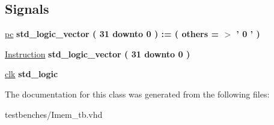 \subsection*{\-Signals}
 \begin{DoxyCompactItemize}
\item 
\hypertarget{class_imem__tb_1_1behavior_a910b9e51355861e290a75682f69dbdb9}{\hyperlink{class_imem__tb_1_1behavior_a910b9e51355861e290a75682f69dbdb9}{pc} {\bfseries std\-\_\-logic\-\_\-vector (   31    downto    0  )  \-:= (  others  = $>$ '  0  '  ) } }\label{class_imem__tb_1_1behavior_a910b9e51355861e290a75682f69dbdb9}

\item 
\hypertarget{class_imem__tb_1_1behavior_aae3aad9bd44aff424227364afa096538}{\hyperlink{class_imem__tb_1_1behavior_aae3aad9bd44aff424227364afa096538}{\-Instruction} {\bfseries std\-\_\-logic\-\_\-vector (   31    downto    0  ) } }\label{class_imem__tb_1_1behavior_aae3aad9bd44aff424227364afa096538}

\item 
\hypertarget{class_imem__tb_1_1behavior_a4934ba9011613a19cbbdc771190f9653}{\hyperlink{class_imem__tb_1_1behavior_a4934ba9011613a19cbbdc771190f9653}{clk} {\bfseries std\-\_\-logic } }\label{class_imem__tb_1_1behavior_a4934ba9011613a19cbbdc771190f9653}

\end{DoxyCompactItemize}


\-The documentation for this class was generated from the following files\-:\begin{DoxyCompactItemize}
\item 
testbenches/\-Imem\-\_\-tb.\-vhd\end{DoxyCompactItemize}
